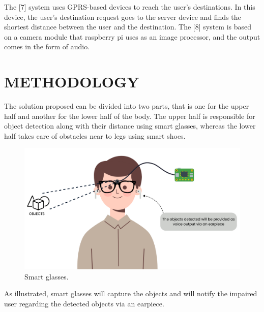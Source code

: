 \documentclass[conference]{IEEEtran}
\begin{document}
The [7] system uses GPRS-based devices to reach the user's destinations. In this device, the user's destination request goes to the server device and finds the shortest distance between the user and the destination. The [8] system is based on a camera module that raspberry pi uses as an image processor, and the output comes in the form of audio. 



\section{METHODOLOGY}
The solution proposed can be divided into two parts, that is one for the upper half and another for the lower half of the body. The upper half is responsible for object detection along with their distance using smart glasses, whereas the lower half takes care of obstacles near to legs using smart shoes.

\begin{figure}[h]
\centering
\includegraphics[width=3in\textwidth]{graphic_upper_300_DPI.png}
\caption{Smart glasses.}
\label{fig_sim}
\end{figure}

As illustrated, smart glasses will capture the objects and will notify the impaired user regarding the detected objects via an earpiece. 
\end{document}
